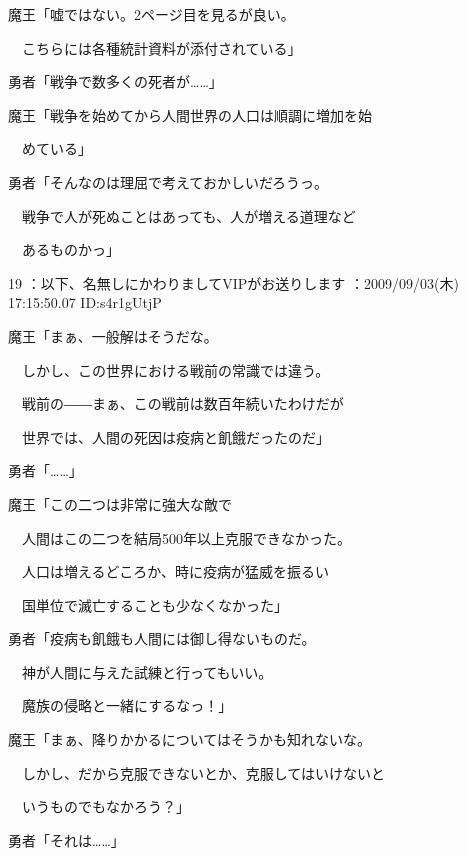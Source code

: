\documentclass[a4j,twocolumn]{tarticle}
\begin{document}
魔王「嘘ではない。2ページ目を見るが良い。\par{} 
　こちらには各種統計資料が添付されている」 



勇者「戦争で数多くの死者が……」 



魔王「戦争を始めてから人間世界の人口は順調に増加を始 \par{}
　めている」\par{} 
勇者「そんなのは理屈で考えておかしいだろうっ。\par{} 
　戦争で人が死ぬことはあっても、人が増える道理など\par{} 
　あるものかっ」 

	
    
    

19 ：以下、名無しにかわりましてVIPがお送りします ：2009/09/03(木) 17:15:50.07 ID:s4r1gUtjP 


魔王「まぁ、一般解はそうだな。\par{} 
　しかし、この世界における戦前の常識では違う。\par{} 
　戦前の――まぁ、この戦前は数百年続いたわけだが\par{} 
　世界では、人間の死因は疫病と飢餓だったのだ」 



勇者「……」 



魔王「この二つは非常に強大な敵で\par{} 
　人間はこの二つを結局500年以上克服できなかった。\par{} 
　人口は増えるどころか、時に疫病が猛威を振るい\par{} 
　国単位で滅亡することも少なくなかった」 



勇者「疫病も飢餓も人間には御し得ないものだ。\par{} 
　神が人間に与えた試練と行ってもいい。\par{} 
　魔族の侵略と一緒にするなっ！」 



魔王「まぁ、降りかかるについてはそうかも知れないな。\par{} 
　しかし、だから克服できないとか、克服してはいけないと\par{} 
　いうものでもなかろう？」 



勇者「それは……」

 
	
    
    
\end{document}
